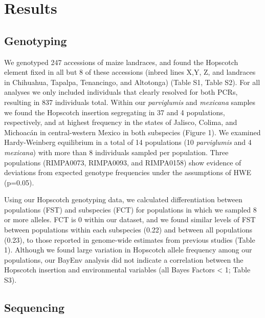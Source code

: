 \documentclass[12pt]{article}
\begin{document}
\section{Results}

\subsection{Genotyping}

We genotyped 247 accessions of maize landraces, and found the Hopscotch element fixed in all but 8 of these accessions (inbred lines X,Y, Z, and landraces in Chihuahua, Tapalpa, Tenancingo, and Altotonga) (Table S1, Table S2). For all analyses we only included individuals that clearly resolved for both PCRs, resulting in 837 individuals total. Within our \emph{parviglumis} and \emph{mexicana} samples we found the Hopscotch insertion segregating in 37 and 4 populations, respectively, and at highest frequency in the states of Jalisco, Colima, and Michoacán in central-western Mexico in both subspecies (Figure 1). We examined Hardy-Weinberg equilibrium in a total of 14 populations (10 \emph{parviglumis} and 4 \emph{mexicana}) with more than 8 individuals sampled per population. Three populations (RIMPA0073, RIMPA0093, and RIMPA0158) show evidence of deviations from expected genotype frequencies under the assumptions of HWE (p=0.05). 

Using our Hopscotch genotyping data, we calculated differentiation between populations (FST) and subspecies (FCT) for populations in which we sampled 8 or more alleles. FCT is 0 within our dataset, and we found similar levels of FST between populations within each subspecies (0.22) and between all populations (0.23), to those reported in genome-wide estimates from previous studies \cite{Pyhajarvi et al 2013} (Table 1). Although we found large variation in Hopscotch allele frequency among our populations, our BayEnv analysis did not indicate a correlation between the Hopscotch insertion and environmental variables (all Bayes Factors < 1; Table S3). 

\subsection{Sequencing}
\end{document}
